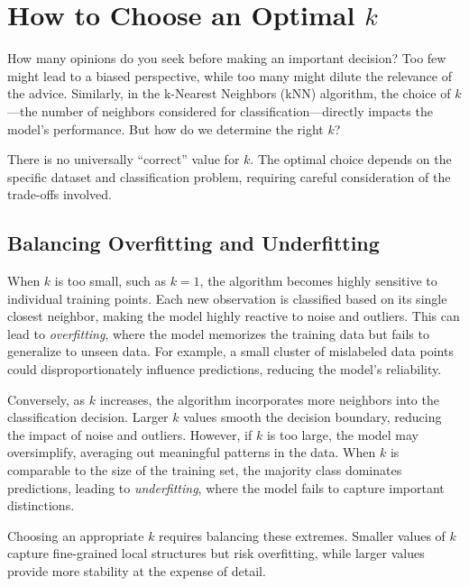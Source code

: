 \documentclass[
  11pt,
]{book}
\theoremstyle{definition}
\theoremstyle{definition}
\theoremstyle{definition}
\theoremstyle{definition}
\theoremstyle{remark}
\begin{document}
\section{\texorpdfstring{How to Choose an Optimal \(k\)}{How to Choose an Optimal k}}\label{how-to-choose-an-optimal-k}

How many opinions do you seek before making an important decision? Too few might lead to a biased perspective, while too many might dilute the relevance of the advice. Similarly, in the k-Nearest Neighbors (kNN) algorithm, the choice of \(k\)---the number of neighbors considered for classification---directly impacts the model's performance. But how do we determine the right \(k\)?

There is no universally ``correct'' value for \(k\). The optimal choice depends on the specific dataset and classification problem, requiring careful consideration of the trade-offs involved.

\subsection*{Balancing Overfitting and Underfitting}\label{balancing-overfitting-and-underfitting}


When \(k\) is too small, such as \(k = 1\), the algorithm becomes highly sensitive to individual training points. Each new observation is classified based on its single closest neighbor, making the model highly reactive to noise and outliers. This can lead to \emph{overfitting}, where the model memorizes the training data but fails to generalize to unseen data. For example, a small cluster of mislabeled data points could disproportionately influence predictions, reducing the model's reliability.

Conversely, as \(k\) increases, the algorithm incorporates more neighbors into the classification decision. Larger \(k\) values smooth the decision boundary, reducing the impact of noise and outliers. However, if \(k\) is too large, the model may oversimplify, averaging out meaningful patterns in the data. When \(k\) is comparable to the size of the training set, the majority class dominates predictions, leading to \emph{underfitting}, where the model fails to capture important distinctions.

Choosing an appropriate \(k\) requires balancing these extremes. Smaller values of \(k\) capture fine-grained local structures but risk overfitting, while larger values provide more stability at the expense of detail.
\end{document}
